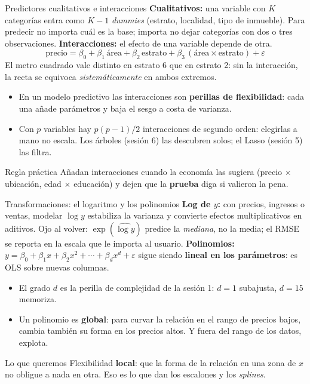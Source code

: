 \documentclass{beamer}
\newcommand{\1}{\mathbb{I}}
\begin{document}
\begin{frame}{Predictores cualitativos e interacciones}
\small
\textbf{Cualitativos:} una variable con $K$ categorías entra como $K-1$ \emph{dummies} (estrato, localidad, tipo de inmueble). Para predecir no importa cuál es la base; importa no dejar categorías con dos o tres observaciones.
\pause
\vspace{0.15cm}
\textbf{Interacciones:} el efecto de una variable depende de otra.
\[ \text{precio} = \beta_0 + \beta_1\,\text{área} + \beta_2\,\text{estrato} + \beta_3\,(\text{área} \times \text{estrato}) + \varepsilon \]
El metro cuadrado vale distinto en estrato 6 que en estrato 2: sin la interacción, la recta se equivoca \emph{sistemáticamente} en ambos extremos.
\pause
\vspace{0.15cm}
\begin{itemize}\itemsep4pt
  \item En un modelo predictivo las interacciones son \textbf{perillas de flexibilidad}: cada una añade parámetros y baja el sesgo a costa de varianza.
  \item Con $p$ variables hay $p(p-1)/2$ interacciones de segundo orden: elegirlas a mano no escala. Los árboles (sesión 6) las descubren solos; el Lasso (sesión 5) las filtra. \pause
\end{itemize}
\begin{block}{Regla práctica}
Añadan interacciones cuando la economía las sugiera (precio $\times$ ubicación, edad $\times$ educación) y dejen que la \textbf{prueba} diga si valieron la pena.
\end{block}
\end{frame}

\begin{frame}{Transformaciones: el logaritmo y los polinomios}
\small
\textbf{Log de $y$:} con precios, ingresos o ventas, modelar $\log y$ estabiliza la varianza y convierte efectos multiplicativos en aditivos. Ojo al volver: $\exp(\widehat{\log y})$ predice la \emph{mediana}, no la media; el RMSE se reporta en la escala que le importa al usuario.
\pause
\vspace{0.15cm}
\textbf{Polinomios:} $y = \beta_0 + \beta_1 x + \beta_2 x^2 + \cdots + \beta_d x^d + \varepsilon$ sigue siendo \textbf{lineal en los parámetros}: es OLS sobre nuevas columnas.
\begin{itemize}\itemsep3pt
  \item El grado $d$ es la perilla de complejidad de la sesión 1: $d = 1$ subajusta, $d = 15$ memoriza.
  \item Un polinomio es \textbf{global}: para curvar la relación en el rango de precios bajos, cambia también su forma en los precios altos. Y fuera del rango de los datos, explota.
\end{itemize}
\pause
\vspace{0.15cm}
\begin{block}{Lo que queremos}
Flexibilidad \textbf{local}: que la forma de la relación en una zona de $x$ no obligue a nada en otra. Eso es lo que dan los escalones y los \emph{splines}.
\end{block}
\end{frame}
\end{document}
